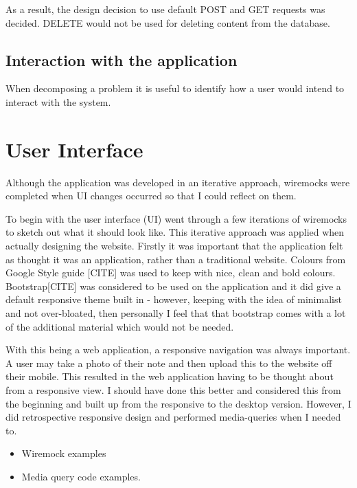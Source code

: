 As a result, the design decision to use default POST and GET requests was decided. DELETE would not be used for deleting content from the database.

\subsection{Interaction with the application}
When decomposing a problem it is useful to identify how a user would intend to interact with the system.





\section{User Interface}
Although the application was developed in an iterative approach, wiremocks were completed when UI changes occurred so that I could reflect on them.

To begin with the user interface (UI) went through a few iterations of wiremocks to sketch out what it should look like.  This iterative approach was applied when actually designing the website. Firstly it was important that the application felt as thought it was an application, rather than a traditional website. Colours from Google Style guide [CITE] was used to keep with nice, clean and bold colours. Bootstrap[CITE] was considered to be used on the application and it did give a default responsive theme built in - however, keeping with the idea of minimalist and not over-bloated, then personally I feel that that bootstrap comes with a lot of the additional material which would not be needed.

With this being a web application, a responsive navigation was always important. A user may take a photo of their note and then upload this to the website off their mobile. This resulted in the web application having to be thought about from a responsive view. I should have done this better and considered this from the beginning and built up from the responsive to the desktop version. However, I did retrospective responsive design and performed media-queries when I needed to.
\begin{itemize}
  \item Wiremock examples
  \item Media query code examples.
\end{itemize}
